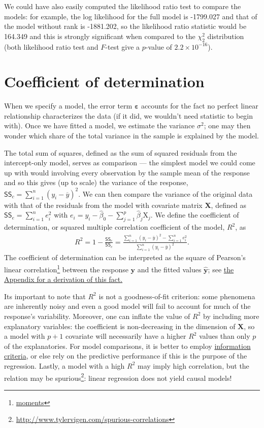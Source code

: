 \documentclass[
  11pt,
  letterpaper,
]{book}
\renewcommand{\href}[2]{#2\footnote{\url{#1}}}
\theoremstyle{definition}
\theoremstyle{definition}
\theoremstyle{definition}
\theoremstyle{remark}
\begin{document}
We could have also easily computed the likelihood ratio test to compare the models: for example, the log likelihood for the full model is -1799.027 and that of the model without rank is -1881.202, so the likelihood ratio statistic would be 164.349 and this is strongly significant when compared to the \(\chi^2_2\) distribution (both likelihood ratio test and \(F\)-test give a \(p\)-value of \(2.2 \times 10^{-16}\)).

\hypertarget{coefR2}{%
\section{Coefficient of determination}\label{coefR2}}

When we specify a model, the error term \(\boldsymbol{\varepsilon}\) accounts for the fact no perfect linear relationship characterizes the data (if it did, we wouldn't need statistic to begin with). Once we have fitted a model, we estimate the variance \(\sigma^2\); one may then wonder which share of the total variance in the sample is explained by the model.

The total sum of squares, defined as the sum of squared residuals from the intercept-only model, serves as comparison --- the simplest model we could come up with would involving every observation by the sample mean of the response and so this gives (up to scale) the variance of the response, \(\mathsf{SS}_c = \sum_{i=1}^n (y_i - \overline{y})^2\). We can then compare the variance of the original data with that of the residuals from the model with covariate matrix \(\mathbf{X}\), defined as \(\mathsf{SS}_e =\sum_{i=1}^n e_i^2\) with \(e_i = y_i - \widehat{\beta}_0 - \sum_{j=1}^p \widehat{\beta}_j\mathrm{X}_j\).
We define the coefficient of determination, or squared multiple correlation coefficient of the model, \(R^2\), as
\begin{align*}
R^2 = 1- \frac{\mathsf{SS}_e}{\mathsf{SS}_c} = \frac{\sum_{i=1}^n (y_i - \overline{y})^2- \sum_{i=1}^n e_i^2}{\sum_{i=1}^n (y_i - \overline{y})^2}.
\end{align*}
The coefficient of determination can be interpreted as the square of \href{moments}{Pearson's linear correlation} between the response \(\boldsymbol{y}\) and the fitted values \(\widehat{\boldsymbol{y}}\); see \protect\hyperlink{derivationR2}{the Appendix for a derivation of this fact.}

Its important to note that \(R^2\) is not a goodness-of-fit criterion: some phenomena are inherently noisy and even a good model will fail to account for much of the response's variability. Moreover, one can inflate the value of \(R^2\) by including more explanatory variables: the coefficient is non-decreasing in the dimension of \(\mathbf{X}\), so a model with \(p+1\) covariate will necessarily have a higher \(R^2\) values than only \(p\) of the explanatories. For model comparisons, it is better to employ \protect\hyperlink{information-criteria}{information criteria}, or else rely on the predictive performance if this is the purpose of the regression. Lastly, a model with a high \(R^2\) may imply high correlation, but \href{http://www.tylervigen.com/spurious-correlations}{the relation may be spurious}: linear regression does not yield causal models!
\end{document}
